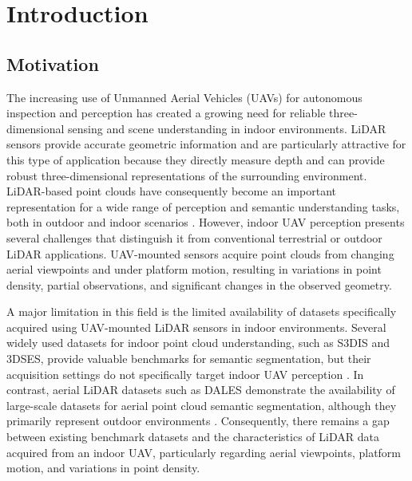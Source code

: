 
\chapter{Introduction}
\label{cha:intro}

\section{Motivation}

The increasing use of Unmanned Aerial Vehicles (UAVs) for autonomous inspection and perception has created a growing need for reliable three-dimensional sensing and scene understanding in indoor environments. LiDAR sensors provide accurate geometric information and are particularly attractive for this type of application because they directly measure depth and can provide robust three-dimensional representations of the surrounding environment. LiDAR-based point clouds have consequently become an important representation for a wide range of perception and semantic understanding tasks, both in outdoor and indoor scenarios \cite{Varney2020DALES,Behley2019SemanticKITTI,Tan2021Toronto3D}. However, indoor UAV perception presents several challenges that distinguish it from conventional terrestrial or outdoor LiDAR applications. UAV-mounted sensors acquire point clouds from changing aerial viewpoints and under platform motion, resulting in variations in point density, partial observations, and significant changes in the observed geometry.

A major limitation in this field is the limited availability of datasets specifically acquired using UAV-mounted LiDAR sensors in indoor environments. Several widely used datasets for indoor point cloud understanding, such as S3DIS and 3DSES, provide valuable benchmarks for semantic segmentation, but their acquisition settings do not specifically target indoor UAV perception \cite{Armeni2016S3DIS,Merizette2025ThreeDSES}. In contrast, aerial LiDAR datasets such as DALES demonstrate the availability of large-scale datasets for aerial point cloud semantic segmentation, although they primarily represent outdoor environments \cite{Varney2020DALES}. Consequently, there remains a gap between existing benchmark datasets and the characteristics of LiDAR data acquired from an indoor UAV, particularly regarding aerial viewpoints, platform motion, and variations in point density.

